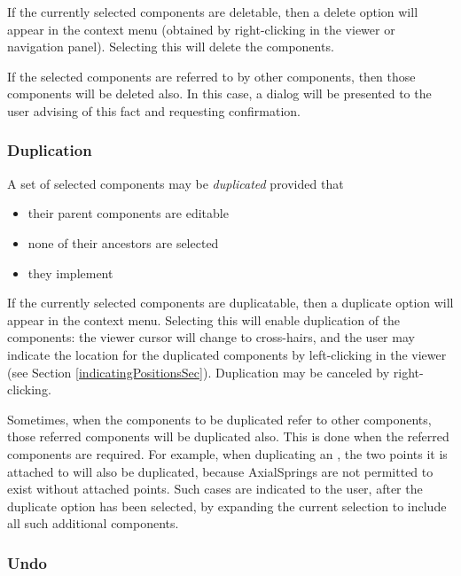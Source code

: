\documentclass{article}
\begin{document}
If the currently selected components are deletable, then a {\sf delete}
option will appear in the context menu (obtained by right-clicking in
the viewer or navigation panel). Selecting this will delete the
components.

If the selected components are referred to by other components, then
those components will be deleted also. In this case, a dialog will be
presented to the user advising of this fact and requesting
confirmation.

\subsubsection{Duplication}

A set of selected components may be {\it duplicated} provided that

\begin{itemize}

\item their parent components are editable

\item none of their ancestors are selected

\item they implement 

\end{itemize}

If the currently selected components are duplicatable, then a
{\sf duplicate} option will appear in the context menu. Selecting this
will enable duplication of the components: the viewer cursor will
change to cross-hairs, and the user may indicate the location for the
duplicated components by left-clicking in the viewer
(see Section \ref{indicatingPositionsSec}).  Duplication may
be canceled by right-clicking.

Sometimes, when the components to be duplicated refer to other
components, those referred components will be duplicated also.  This is
done when the referred components are required.  For example, when
duplicating an , the two
points it is attached to will also be duplicated, because AxialSprings
are not permitted to exist without attached points.  Such cases are
indicated to the user, after the {\sf duplicate} option has been selected,
by expanding the current selection to include all such additional
components.

\subsubsection{Undo}
\end{document}
